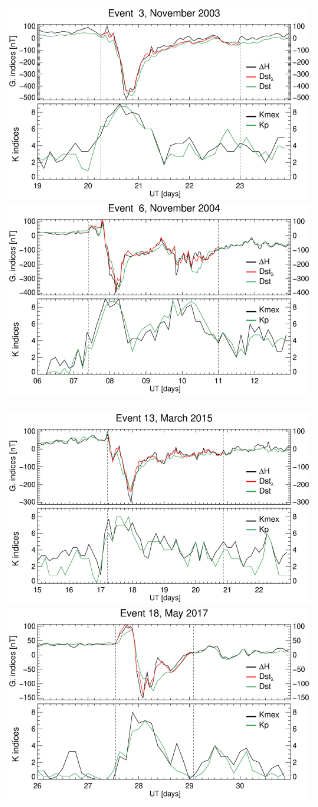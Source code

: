 \documentclass[a4paper,fleqn]{cas-dc}
\begin{document}
\begin{figure}[h!]
	\centering
	\centerline{\Large \bf   
		\hfill}
	\centerline{\Large \bf   
		\hspace{0.26\textwidth}  \color{black}{}
		\hspace{0.31\textwidth}  \color{black}{}
		\hfill}
	\includegraphics[width=8.0cm]{images/dH_approx/diono_valid_V4_2003-11-19.eps}
	\includegraphics[width=8.0cm]{images/dH_approx/diono_valid_V4_2004-11-06.eps} 		

	\centerline{\Large \bf   
	\hspace{0.26\textwidth}  \color{black}{}
	\hspace{0.31\textwidth}  \color{black}{}
	\hfill}	   
	\includegraphics[width=8.0cm]{images/dH_approx/diono_valid_V4_2015-03-15.eps}
	\includegraphics[width=8.0cm]{images/dH_approx/diono_valid_V4_2017-05-26.eps} 		
	

\end{figure}
\end{document}
